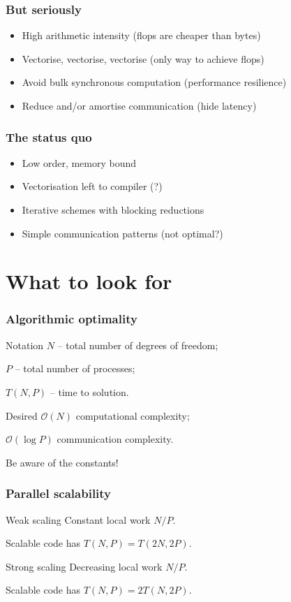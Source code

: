 \documentclass[presentation]{beamer}
\newcommand{\xmark}{\ding{55}}
\begin{document}
\begin{frame}
  \frametitle{But seriously}
  \begin{itemize}
  \item High arithmetic intensity (flops are cheaper than bytes)
  \item Vectorise, vectorise, vectorise (only way to achieve flops)
  \item Avoid bulk synchronous computation (performance resilience)
  \item Reduce and/or amortise communication (hide latency)
  \end{itemize}
\end{frame}

\begin{frame}
  \frametitle{The status quo}
  \begin{itemize}
  \item[\xmark] Low order, memory bound
  \item[\xmark] Vectorisation left to compiler (?)
  \item[\xmark] Iterative schemes with blocking reductions
  \item[\xmark] Simple communication patterns (not optimal?)
  \end{itemize}
\end{frame}


\section{What to look for}

\begin{frame}
  \frametitle{Algorithmic optimality}
  \begin{block}{Notation}
  $N$ -- total number of degrees of freedom;

  $P$ -- total number of processes;

  $T(N, P)$ -- time to solution.
  \end{block}

  \begin{block}{Desired}
    $\mathcal{O}(N)$ computational complexity;

    $\mathcal{O}(\log P)$ communication complexity.

    Be aware of the constants!
  \end{block}
\end{frame}

\begin{frame}
  \frametitle{Parallel scalability}

  \begin{block}{Weak scaling}
    Constant local work $N/P$.

    Scalable code has $T(N, P) = T(2N, 2P)$.
  \end{block}

  \begin{block}{Strong scaling}
    Decreasing local work $N/P$.

    Scalable code has $T(N, P) = 2T(N, 2P)$.
  \end{block}

\end{frame}
\end{document}
